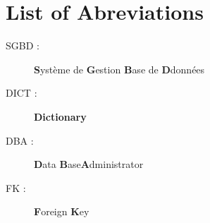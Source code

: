 \chapter*{List of Abreviations}

	\begin{description}
	\item[SGBD :]  \textbf{S}ystème de \textbf{G}estion \textbf{B}ase de \textbf{D}données
	\item[DICT :]   \textbf{Dictionary}
	\item[DBA  :]   \textbf{D}ata \textbf{B}ase\textbf{A}dministrator
	\item[FK   :]    \textbf{F}oreign \textbf{K}ey
	
	
	\end{description}
